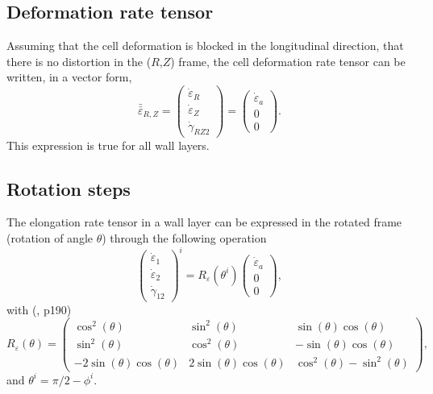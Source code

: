 \documentclass[]{article}
\begin{document}
\subsection{Deformation rate tensor}
Assuming that the cell deformation is blocked in the longitudinal direction, that there is no distortion in the ($R$,$Z$) frame, the cell deformation rate tensor can be written, in a vector form,
\begin{equation}
	\boxed{
	\bar{\bar{\varepsilon}}_{R,Z}= \left(\begin{matrix}
		\dot{\varepsilon}_R\\
		\dot{\varepsilon}_Z\\
		\dot{\gamma}_{RZ2}
	\end{matrix}\right)
=
\left(\begin{matrix}
	\dot{\varepsilon}_a\\
	0\\
	0
\end{matrix}\right)}.
\end{equation}
This expression is true for all wall layers.
\subsection{Rotation steps}
The elongation rate tensor in a wall layer can be expressed in the rotated frame (rotation of angle $\theta$) through the following operation  
\begin{equation}
	\left(\begin{matrix}
		\dot{\varepsilon}_1\\
		\dot{\varepsilon}_2\\
		\dot{\gamma}_{12}
	\end{matrix}\right)^i
=
R_{\varepsilon}(\theta^i)
\left(\begin{matrix}
	\dot{\varepsilon}_a\\
	0\\
	0
\end{matrix}\right),
\end{equation}
with (\citet{aga17}, p190)
\begin{equation}
R_{\varepsilon}(\theta)
	=
	\left(\begin{matrix}
	\cos^2(\theta) & \sin^2(\theta) & \sin(\theta)\cos(\theta)\\
	\sin^2(\theta) & \cos^2(\theta) & -\sin(\theta)\cos(\theta)\\
	-2\sin(\theta)\cos(\theta) & 2\sin(\theta)\cos(\theta) & \cos^2(\theta)-\sin^2(\theta)
\end{matrix}\right)
,
\end{equation}
and $\theta^i=\pi/2-\phi^i$.
\end{document}
